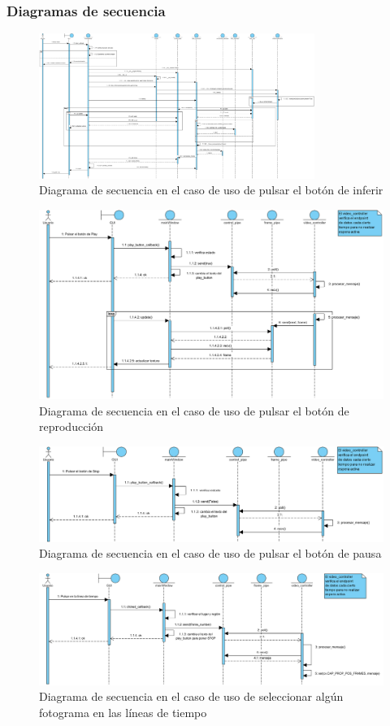 \subsubsection*{Diagramas de secuencia}
\label{esquema:SecuenciaInferir}
\begin{figure}[H]
    \centering
    \includegraphics[angle=90,origin=c,width=0.80\textwidth]{images/13/c/Inferir.png}
    \caption{Diagrama de secuencia en el caso de uso de pulsar el botón de inferir}
\end{figure}
\clearpage
\label{esquema:SecuenciaResto}
\begin{figure}[H]
    \centering
    \includegraphics[width=\textwidth]{images/13/c/Play.png}
    \caption{Diagrama de secuencia en el caso de uso de pulsar el botón de reproducción}
\end{figure}
\begin{figure}[H]
    \centering
    \includegraphics[width=\textwidth]{images/13/c/Stop.png}
    \caption{Diagrama de secuencia en el caso de uso de pulsar el botón de pausa}
\end{figure}
\begin{figure}[H]
    \centering
    \includegraphics[width=\textwidth]{images/13/c/changeFrame.png}
    \caption{Diagrama de secuencia en el caso de uso de seleccionar algún fotograma en las líneas de tiempo}
\end{figure}